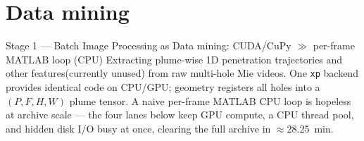\documentclass[aspectratio=169,11pt]{beamer}
\newcommand{\good}[1]{\textcolor{goodGreen}{#1}}
\begin{document}
\section{Data mining}

\begin{frame}{Stage 1 --- Batch Image Processing as Data mining: CUDA/CuPy $\gg$ per-frame MATLAB loop (CPU)}
\small
Extracting plume-wise 1D penetration trajectories and other features(currently unused) from raw multi-hole Mie videos. 
One \texttt{xp} backend provides identical code on CPU/GPU; geometry registers all holes into a $(P,F,H,W)$ plume tensor.
A naive per-frame MATLAB CPU loop is hopeless at archive scale --- the four lanes below keep
GPU compute, a CPU thread pool, and hidden disk I/O busy at once, clearing the
\good{full archive in $\approx$\SI{28.25}{min}}.
\smallskip


\end{frame}
\end{document}

